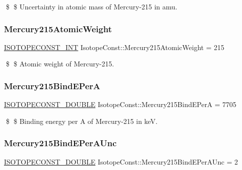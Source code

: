 \$ \$ Uncertainty in atomic mass of Mercury-\/215 in amu. \mbox{\label{group___isotope_const-_mercury-_hg215_gad50d12baf68579d43ab23cc70e6efa87}} 
\subsubsection{\texorpdfstring{Mercury215\+Atomic\+Weight}{Mercury215AtomicWeight}}
{\footnotesize\ttfamily \mbox{\hyperlink{group___isotope_const-_macros_ga5f18360b3e99483a35c32d789e62621c}{I\+S\+O\+T\+O\+P\+E\+C\+O\+N\+S\+T\+\_\+\+I\+NT}} Isotope\+Const\+::\+Mercury215\+Atomic\+Weight = 215}

\$ \$ Atomic weight of Mercury-\/215. \mbox{\label{group___isotope_const-_mercury-_hg215_ga5bfcbfa46239606903fcf95c3868b4af}} 
\subsubsection{\texorpdfstring{Mercury215\+Bind\+E\+PerA}{Mercury215BindEPerA}}
{\footnotesize\ttfamily \mbox{\hyperlink{group___isotope_const-_macros_ga8f45a7272ce02c0b4c65c44636ed719a}{I\+S\+O\+T\+O\+P\+E\+C\+O\+N\+S\+T\+\_\+\+D\+O\+U\+B\+LE}} Isotope\+Const\+::\+Mercury215\+Bind\+E\+PerA = 7705}

\$ \$ Binding energy per A of Mercury-\/215 in keV. \mbox{\label{group___isotope_const-_mercury-_hg215_ga9541fd567ae2b0e9872dbc7d3fbaec62}} 
\subsubsection{\texorpdfstring{Mercury215\+Bind\+E\+Per\+A\+Unc}{Mercury215BindEPerAUnc}}
{\footnotesize\ttfamily \mbox{\hyperlink{group___isotope_const-_macros_ga8f45a7272ce02c0b4c65c44636ed719a}{I\+S\+O\+T\+O\+P\+E\+C\+O\+N\+S\+T\+\_\+\+D\+O\+U\+B\+LE}} Isotope\+Const\+::\+Mercury215\+Bind\+E\+Per\+A\+Unc = 2}

